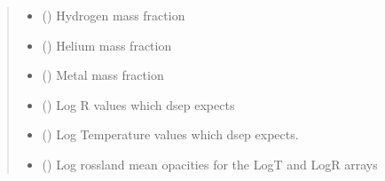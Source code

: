 \documentclass[letterpaper,10pt,english]{sphinxmanual}
\begin{document}
\begin{fulllineitems}
\begin{quote}
\begin{description}
\begin{itemize}
\item {} 
\sphinxAtStartPar
{} () \textendash{} Hydrogen mass fraction

\item {} 
\sphinxAtStartPar
{} () \textendash{} Helium mass fraction

\item {} 
\sphinxAtStartPar
{} () \textendash{} Metal mass fraction

\item {} 
\sphinxAtStartPar
{} () \textendash{} Log R values which dsep expects

\item {} 
\sphinxAtStartPar
{} () \textendash{} Log Temperature values which dsep expects.

\item {} 
\sphinxAtStartPar
{} () \textendash{} Log rossland mean opacities for the LogT and LogR arrays

\end{itemize}


\end{description}\end{quote}

\end{fulllineitems}

\end{document}

